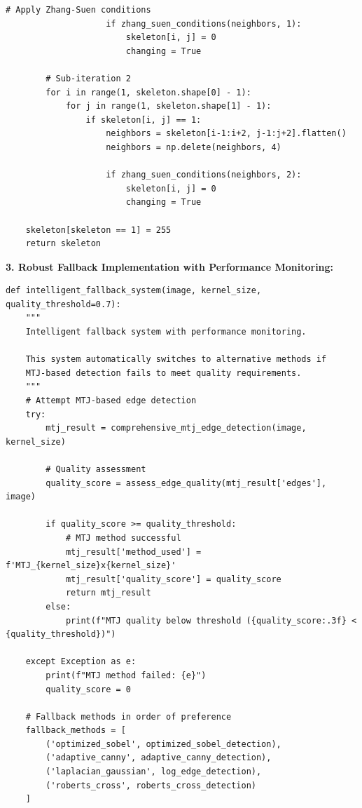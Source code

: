 \documentclass[conference]{IEEEtran}
\begin{document}
{{{{{{{{{{\begin{lstlisting}[caption={Multi-scale noise reduction with edge preservation}]
                    # Apply Zhang-Suen conditions
                    if zhang_suen_conditions(neighbors, 1):
                        skeleton[i, j] = 0
                        changing = True
        
        # Sub-iteration 2
        for i in range(1, skeleton.shape[0] - 1):
            for j in range(1, skeleton.shape[1] - 1):
                if skeleton[i, j] == 1:
                    neighbors = skeleton[i-1:i+2, j-1:j+2].flatten()
                    neighbors = np.delete(neighbors, 4)
                    
                    if zhang_suen_conditions(neighbors, 2):
                        skeleton[i, j] = 0
                        changing = True
    
    skeleton[skeleton == 1] = 255
    return skeleton
\end{lstlisting}

\textbf{3. Robust Fallback Implementation with Performance Monitoring:}
\begin{lstlisting}[caption={Intelligent fallback system with performance monitoring}]
def intelligent_fallback_system(image, kernel_size, quality_threshold=0.7):
    """
    Intelligent fallback system with performance monitoring.
    
    This system automatically switches to alternative methods if
    MTJ-based detection fails to meet quality requirements.
    """
    # Attempt MTJ-based edge detection
    try:
        mtj_result = comprehensive_mtj_edge_detection(image, kernel_size)
        
        # Quality assessment
        quality_score = assess_edge_quality(mtj_result['edges'], image)
        
        if quality_score >= quality_threshold:
            # MTJ method successful
            mtj_result['method_used'] = f'MTJ_{kernel_size}x{kernel_size}'
            mtj_result['quality_score'] = quality_score
            return mtj_result
        else:
            print(f"MTJ quality below threshold ({quality_score:.3f} < {quality_threshold})")
            
    except Exception as e:
        print(f"MTJ method failed: {e}")
        quality_score = 0
    
    # Fallback methods in order of preference
    fallback_methods = [
        ('optimized_sobel', optimized_sobel_detection),
        ('adaptive_canny', adaptive_canny_detection),
        ('laplacian_gaussian', log_edge_detection),
        ('roberts_cross', roberts_cross_detection)
    ]
    

\end{lstlisting}}}}}}}}}}}
\end{document}
